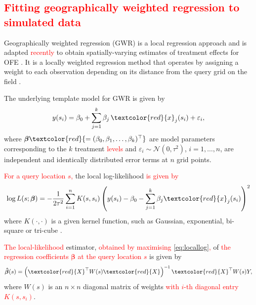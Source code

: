 \documentclass[a4paper]{article} 	%
\newcommand{\N}{\mathcal{N}}
\newcommand{\revision}[1]{\textcolor{red}{#1}}
\begin{document}


\subsection{\revision{Fitting geographically weighted regression to simulated data}}\label{sec:gwr}

Geographically weighted regression (GWR) is a local regression approach and is adapted \revision{recently} to obtain spatially-varying estimates of treatment effects for OFE \parencite{Rakshit2020Novel}.  It is a locally weighted regression method that operates by assigning a weight to each observation depending on its distance from the query grid on the field \parencite{Paez2002General}. 


The underlying template model for GWR is given by 
\begin{equation}\label{eq:basicgwr}
	y(s_i) =  \beta_0 + \sum_{j=1}^{k} \beta_j \, \revision{x}_j(s_i) + \varepsilon_i, 
\end{equation}
where $\bm{\beta}\revision{ = (\beta_0, \beta_{1}, \ldots, \beta_{k})^{\top}}$ are model parameters corresponding to the $k$ treatment \revision{levels} and $\varepsilon_{i} \sim \N(0,\tau^2)$,  $i=1,\ldots,n$,  are independent and identically distributed error terms at $n$ grid points. 

\revision{For a query location $s$,} the local log-likelihood \revision{is given by} 
\begin{eqnarray}\label{eq:locallog}
	\log L(s; \bm{\beta}) = - \frac{1}{2\tau^2}\sum_{i=1}^{n}K(s,s_i)\left( y(s_i) -\beta_0 - \sum_{j=1}^{k}\beta_j \revision{x}_j(s_i) \right)^2 
\end{eqnarray}
where $K(\cdot,\cdot)$ is a given kernel function, such as Gaussian, exponential, bi-square or tri-cube \parencite{Gollini2015GWmodel}. 

\revision{The local-likelihood} estimator,  \revision{obtained by maximising \eqref{eq:locallog},} of \revision{the regression coefficients $\bm{\beta}$ at the query location $s$} is given by  
\begin{eqnarray}\label{eq:betahat}
	\bm{\hat{\beta}}(s) = \left( \revision{X}^\top W(s) \revision{X} \right)^{-1}\revision{X}^\top W(s) Y,
\end{eqnarray}
where $W(s)$ is an $n\times n$ diagonal matrix of weights \revision{with $i$-th diagonal entry $K(s,s_i)$}. 
\end{document}
